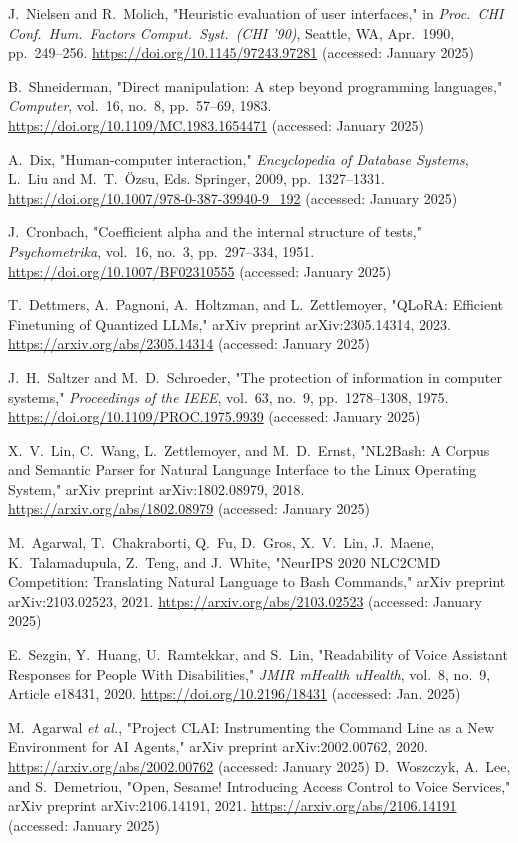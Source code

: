 \documentclass[a4paper,12pt]{article}
\begin{document}
\begin{thebibliography}{30}
 J.~Nielsen and R.~Molich, "Heuristic evaluation of user interfaces," in \textit{Proc.~CHI Conf.~Hum.~Factors Comput.~Syst.~(CHI '90)}, Seattle, WA, Apr.~1990, pp.~249--256. \url{https://doi.org/10.1145/97243.97281} (accessed: January 2025)

 B.~Shneiderman, "Direct manipulation: A step beyond programming languages," \textit{Computer}, vol.~16, no.~8, pp.~57--69, 1983. \url{https://doi.org/10.1109/MC.1983.1654471} (accessed: January 2025)

 A.~Dix, "Human-computer interaction," \textit{Encyclopedia of Database Systems}, L.~Liu and M.~T.~Özsu, Eds. Springer, 2009, pp.~1327--1331. \url{https://doi.org/10.1007/978-0-387-39940-9_192} (accessed: January 2025)

 J.~Cronbach, "Coefficient alpha and the internal structure of tests," \textit{Psychometrika}, vol.~16, no.~3, pp.~297--334, 1951. \url{https://doi.org/10.1007/BF02310555} (accessed: January 2025)

 T.~Dettmers, A.~Pagnoni, A.~Holtzman, and L.~Zettlemoyer, "QLoRA: Efficient Finetuning of Quantized LLMs," arXiv preprint arXiv:2305.14314, 2023. \url{https://arxiv.org/abs/2305.14314} (accessed: January 2025)

 J.~H.~Saltzer and M.~D.~Schroeder, "The protection of information in computer systems," \textit{Proceedings of the IEEE}, vol.~63, no.~9, pp.~1278--1308, 1975. \url{https://doi.org/10.1109/PROC.1975.9939} (accessed: January 2025)

 X.~V.~Lin, C.~Wang, L.~Zettlemoyer, and M.~D.~Ernst, "NL2Bash: A Corpus and Semantic Parser for Natural Language Interface to the Linux Operating System," arXiv preprint arXiv:1802.08979, 2018. \url{https://arxiv.org/abs/1802.08979} (accessed: January 2025)

 M.~Agarwal, T.~Chakraborti, Q.~Fu, D.~Gros, X.~V.~Lin, J.~Maene, K.~Talamadupula, Z.~Teng, and J.~White, "NeurIPS 2020 NLC2CMD Competition: Translating Natural Language to Bash Commands," arXiv preprint arXiv:2103.02523, 2021. \url{https://arxiv.org/abs/2103.02523} (accessed: January 2025)

 E.~Sezgin, Y.~Huang, U.~Ramtekkar, and S.~Lin, "Readability of Voice Assistant Responses for People With Disabilities," \textit{JMIR mHealth uHealth}, vol.~8, no.~9, Article e18431, 2020. \url{https://doi.org/10.2196/18431} (accessed: Jan. 2025)

 M.~Agarwal \textit{et al.}, "Project CLAI: Instrumenting the Command Line as a New Environment for AI Agents," arXiv preprint arXiv:2002.00762, 2020. \url{https://arxiv.org/abs/2002.00762} (accessed: January 2025)
 D.~Woszczyk, A.~Lee, and S.~Demetriou, "Open, Sesame! Introducing Access Control to Voice Services," arXiv preprint arXiv:2106.14191, 2021. \url{https://arxiv.org/abs/2106.14191} (accessed: January 2025)

\end{thebibliography}
\end{document}

